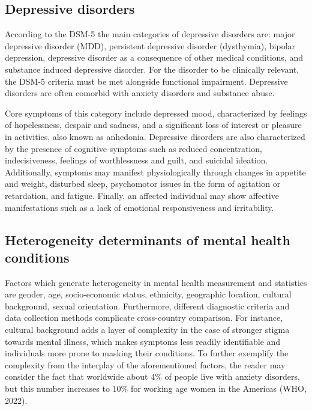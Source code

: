         \subsection{Depressive disorders}
            According to the DSM-5 the main categories of depressive disorders are: major depressive disorder (MDD), persistent depressive disorder (dysthymia), bipolar depression, depressive disorder as a consequence of other medical conditions, and substance induced depressive disorder. For the disorder to be clinically relevant, the DSM-5 criteria must be met alongside functional impairment.
            Depressive disorders are often comorbid with anxiety disorders and substance abuse. 

            Core symptoms of this category include depressed mood, characterized by feelings of hopelessness, despair and sadness, and a significant loss of interest or pleasure in activities, also known as anhedonia. Depressive disorders are also characterized by the presence of cognitive symptoms such as reduced concentration, indecisiveness, feelings of worthlessness and guilt, and suicidal ideation. Additionally, symptoms may manifest physiologically through changes in appetite and weight, disturbed sleep, psychomotor issues in the form of agitation or retardation, and fatigue. Finally, an affected individual may show affective manifestations such as a lack of emotional responsiveness and irritability. 
        \subsection{Heterogeneity determinants of mental health conditions}
            Factors which generate heterogeneity in mental  health measurement and statistics are gender, age, socio-economic status, ethnicity, geographic location, cultural background, sexual orientation. Furthermore, different diagnostic criteria and data collection methods complicate cross-country comparison. 
            For instance, cultural background adds a layer of complexity in the case of stronger stigma towards mental illness, which makes symptoms less readily identifiable and individuals more prone to masking their conditions.  
            To further exemplify the complexity from the interplay of the aforementioned factors, the reader may consider the fact that worldwide about 4\% of people live with anxiety disorders, but this number increases to 10\% for working age women in the Americas (WHO, 2022). 
        

